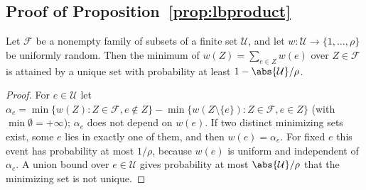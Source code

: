 \subsection{Proof of Proposition~\ref{prop:lbproduct}}\label{app:lbproduct}

\begin{lemma}\label{lem:isolation}
Let $\mathcal F$ be a nonempty family of subsets of a finite set $\mathcal U$,
and let $w:\mathcal U\to\{1,\dots,\rho\}$ be uniformly random. Then the minimum
of $w(Z)=\sum_{e\in Z}w(e)$ over $Z\in\mathcal F$ is attained by a unique set
with probability at least $1-\abs{\mathcal U}/\rho$.
\end{lemma}

\begin{proof}
For $e\in\mathcal U$ let $\alpha_e=\min\{w(Z):Z\in\mathcal F,e\notin Z\}
-\min\{w(Z\setminus\{e\}):Z\in\mathcal F,e\in Z\}$ (with
$\min\emptyset=+\infty$); $\alpha_e$ does not depend on $w(e)$. If two
distinct minimizing sets exist, some $e$ lies in exactly one of them, and
then $w(e)=\alpha_e$. For fixed $e$ this event has probability at most
$1/\rho$, because $w(e)$ is uniform and independent of $\alpha_e$. A union
bound over $e\in\mathcal U$ gives probability at most $\abs{\mathcal U}/\rho$
that the minimizing set is not unique.
\end{proof}

